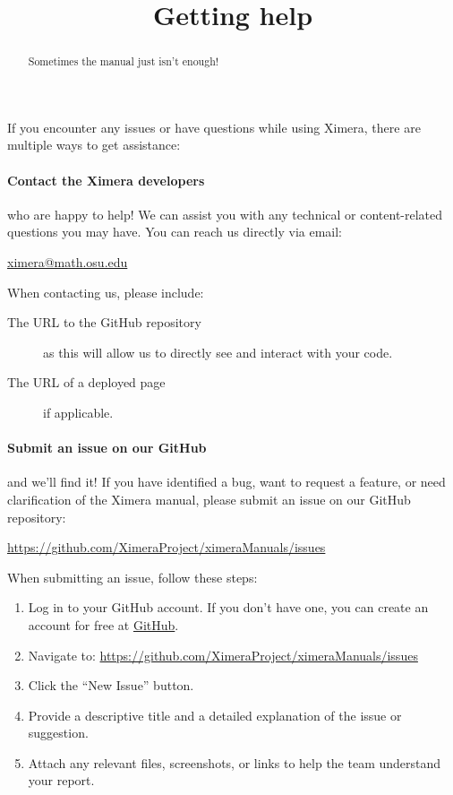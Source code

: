 \documentclass{ximera}
\title{Getting help}
\begin{document}
\begin{abstract}
    Sometimes the manual just isn't enough!
\end{abstract}
\maketitle

If you encounter any issues or have questions while using Ximera, there are
multiple ways to get assistance:

\paragraph{Contact the Ximera developers} who are happy to help! We can assist
you with any technical or content-related questions you may have. You can reach
us directly via email:
\begin{center}
    \url{ximera@math.osu.edu}
\end{center}

When contacting us, please include: 
\begin{description}
    \item[The URL to the GitHub repository] as this will allow us to directly see and interact with your code. 
    \item[The URL of a deployed page] if applicable. 
\end{description}

\paragraph{Submit an issue on our GitHub} and we'll find it! If you have identified a bug, want to request a feature, or need clarification
of the Ximera manual, please submit an issue on our GitHub repository:

\begin{center}
    \url{https://github.com/XimeraProject/ximeraManuals/issues}
\end{center}

When submitting an issue, follow these steps:
\begin{enumerate}
    \item Log in to your GitHub account. If you don't have one, you can create
          an account for free at \href{https://github.com}{GitHub}.
    \item Navigate to:
          \url{https://github.com/XimeraProject/ximeraManuals/issues}
    \item Click the ``New Issue'' button.
    \item Provide a descriptive title and a detailed explanation of the issue
          or suggestion.
    \item Attach any relevant files, screenshots, or links to help the team
          understand your report.
\end{enumerate}
\end{document}
